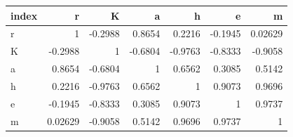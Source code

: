 \begin{tabular}{lrrrrrr}
\toprule
index & r & K & a & h & e & m \\
\midrule
r & 1 & -0.2988 & 0.8654 & 0.2216 & -0.1945 & 0.02629 \\
K & -0.2988 & 1 & -0.6804 & -0.9763 & -0.8333 & -0.9058 \\
a & 0.8654 & -0.6804 & 1 & 0.6562 & 0.3085 & 0.5142 \\
h & 0.2216 & -0.9763 & 0.6562 & 1 & 0.9073 & 0.9696 \\
e & -0.1945 & -0.8333 & 0.3085 & 0.9073 & 1 & 0.9737 \\
m & 0.02629 & -0.9058 & 0.5142 & 0.9696 & 0.9737 & 1 \\
\bottomrule
\end{tabular}
